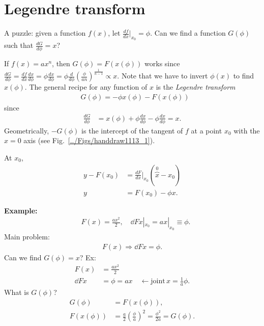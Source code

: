 \section{Legendre transform}

A puzzle: given a function $f(x)$, let $\frac{df}{dx}\Bigr|_{x_{0}}=\phi$.
Can we find a function $G(\phi)$ such that $\frac{dG}{d\phi}=x$?

If $f(x)=ax^{n}$, then $G(\phi)=F\left(x(\phi)\right)$ works since
$\frac{dG}{d\phi}=\frac{df}{dx}\frac{dx}{d\phi}=\phi\frac{dx}{d\phi}=\phi\frac{d}{d\phi}\left(\frac{\phi}{an}\right)^{\frac{1}{n-1}}\propto x$.
Note that we have to invert $\phi(x)$ to find $x(\phi)$. The general
recipe for any function of $x$ is the \emph{Legendre transform}
\begin{align}
 & \boxed{G(\phi)=-\phi x(\phi)-F\left(x(\phi)\right)}
\end{align}
since
\begin{align}
\frac{dG}{d\phi} & =x(\phi)+\phi\frac{dx}{d\phi}-\phi\frac{dx}{d\phi}=x.
\end{align}
Geometrically, $-G(\phi)$ is the intercept of the tangent of $f$ at a point $x_{0}$ with the $x=0$ axis (see Fig.~\ref{../Figs/handdraw1113_1}).

At $x_{0}$,
\begin{align}
y-F\left(x_{0}\right) & =\frac{dF}{dx}\Bigr|_{x_{0}}(\overbrace{x}^{0}-x_{0})\\
y & =F\left(x_{0}\right)-\phi x.
\end{align}


\textbf{Example:}
\begin{align}
\quad F(x)= \frac{ax^2}{2},\quad \dd{F}{x}|_{x_0} = ax|_{x_0} \equiv \phi.
\end{align}
Main problem:\begin{align}
F(x) \Rightarrow \dd{F}{x} = \phi.
\end{align}
Can we find $G(\phi )=x$?
Ex: \begin{align}
F(x) &= \frac{ax^2}{2}\\
\dd{F}{x} & = \phi =ax\quad \leftarrow \mathrm{joint}\, x=\frac{1}{a}\phi.
\end{align}
What is $ G(\phi) $? 
\begin{align}
G(\phi) &= F(x(\phi)),\\
F(x(\phi)) &= \frac{a}{2}\left( \frac{\phi}{a} \right)^2 = \frac{\phi^2}{2a}=G(\phi).
\end{align}

